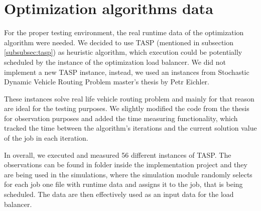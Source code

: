 \section{Optimization algorithms data}\label{sec:optimization-algorithms-data}
For the proper testing environment,
the real runtime data of the optimization algorithm were needed.
We decided to use TASP (mentioned in subsection \ref{subsubsec:tasp}) as heuristic algorithm,
which execution could be potentially scheduled by the instance of the optimization load balancer.
We did not implement a new TASP instance,
instead,
we used an instances from Stochastic Dynamic Vehicle Routing Problem master's thesis by Petr Eichler\cite{Eichler:Petr:2003}.

These instances solve real life vehicle routing problem 
and mainly for that reason are ideal for the testing purposes.
We slightly modified the code from the thesis for observation purposes
and added the time measuring functionality,
which tracked the time between the algorithm's iterations and the current solution value of the job in each iteration.

In overall,
we executed and measured 56 different instances of TASP.
The observations can be found in  folder inside the implementation project
and they are being used in the simulations,
where the simulation module randomly selects for each job one file with runtime data
and assigns it to the job, that is being scheduled.
The data are then effectively used as an input data for the load balancer.
